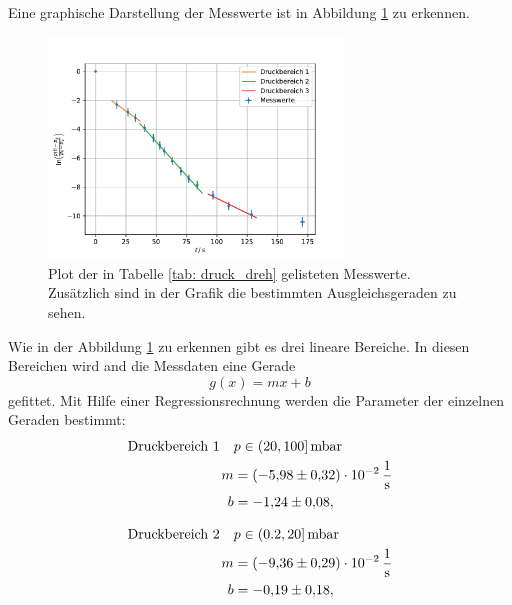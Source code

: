 Eine graphische Darstellung der Messwerte ist in Abbildung \ref{fig: druck_dreh} zu erkennen.

\FloatBarrier
\begin{figure}[h]
  \centering
  \includegraphics[width=0.7\textwidth]{../Messdaten/plots/dreh/druckplot_drehschieber.pdf}
  \caption{Plot der in Tabelle \ref{tab: druck_dreh} gelisteten Messwerte. Zusätzlich sind in der Grafik die bestimmten Ausgleichsgeraden zu sehen.}
  \label{fig: druck_dreh}
\end{figure}
\FloatBarrier

Wie in der Abbildung \ref{fig: druck_dreh} zu erkennen gibt es drei lineare Bereiche.
In diesen Bereichen wird and die Messdaten eine Gerade
\begin{equation}
  \label{eq: geradengleichung}
  g(x)=mx+b
\end{equation}
gefittet. Mit Hilfe einer Regressionsrechnung werden die Parameter der einzelnen Geraden bestimmt:
\begin{align}
  \label{eq: regression_dreh_druck_1}
  \begin{aligned}
  \text{Druckbereich 1} \quad  &p\in(20,100]\,\si{\milli\bar} \\
  m&=\SI{-5.98\pm0.32 e-2}{\per\second} \\
  b&=\num{-1.24 \pm0.08 },
\end{aligned}
\end{align}

\begin{align}
  \label{eq: regression_dreh_druck_2}
  \begin{aligned}
  \text{Druckbereich 2} \quad  &p\in(0.2,20]\,\si{\milli\bar} \\
  m&=\SI{-9.36\pm0.29 e-2}{\per\second} \\
  b&=\num{-0.19 \pm0.18 },
\end{aligned}
\end{align}

